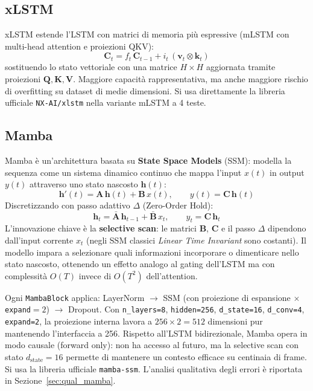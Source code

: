 \documentclass[12pt, a4paper]{article}
\begin{document}
\subsection{xLSTM}
xLSTM \cite{beck2024xlstm} estende l'LSTM con matrici di memoria pi\`u
espressive (mLSTM con multi-head attention e proiezioni QKV):
\begin{equation}
  \mathbf{C}_t = f_t\,\mathbf{C}_{t-1} + i_t\,(\mathbf{v}_t \otimes \mathbf{k}_t)
\end{equation}
sostituendo lo stato vettoriale con una matrice $H\times H$ aggiornata tramite
proiezioni $\mathbf{Q}, \mathbf{K}, \mathbf{V}$. Maggiore capacit\`a
rappresentativa, ma anche maggiore rischio di overfitting su dataset di medie
dimensioni. Si usa direttamente la libreria ufficiale \texttt{NX-AI/xlstm}
nella variante mLSTM a 4 teste.

\subsection{Mamba}
\label{sec:mamba}
Mamba \cite{gu2024mamba} \`e un'architettura basata su \textbf{State Space Models}
(SSM): modella la sequenza come un sistema dinamico continuo che mappa l'input
$x(t)$ in output $y(t)$ attraverso uno stato nascosto $\mathbf{h}(t)$:
\begin{equation}
  \mathbf{h}'(t) = \mathbf{A}\,\mathbf{h}(t) + \mathbf{B}\,x(t), \qquad
  y(t) = \mathbf{C}\,\mathbf{h}(t)
\end{equation}
Discretizzando con passo adattivo $\Delta$ (Zero-Order Hold):
\begin{equation}
  \mathbf{h}_t = \bar{\mathbf{A}}\,\mathbf{h}_{t-1} + \bar{\mathbf{B}}\,x_t,
  \qquad y_t = \mathbf{C}\,\mathbf{h}_t
\end{equation}
L'innovazione chiave \`e la \textbf{selective scan}: le matrici
$\mathbf{B}$, $\mathbf{C}$ e il passo $\Delta$ dipendono dall'input corrente
$x_t$ (negli SSM classici \textit{Linear Time Invariant} sono costanti).
Il modello impara a selezionare quali informazioni incorporare o dimenticare
nello stato nascosto, ottenendo un effetto analogo al gating dell'LSTM ma
con complessit\`a $O(T)$ invece di $O(T^2)$ dell'attention.

Ogni \texttt{MambaBlock} applica: LayerNorm $\to$ SSM (con proiezione di
espansione $\times$\texttt{expand}$=2$) $\to$ Dropout.
Con \texttt{n\_layers=8}, \texttt{hidden=256}, \texttt{d\_state=16},
\texttt{d\_conv=4}, \texttt{expand=2}, la proiezione interna lavora a
$256\times 2=512$ dimensioni pur mantenendo l'interfaccia a 256.
Rispetto all'LSTM bidirezionale, Mamba opera in modo causale (forward only):
non ha accesso al futuro, ma la selective scan con stato
$d_{\text{state}}=16$ permette di mantenere un contesto efficace su centinaia
di frame. Si usa la libreria ufficiale \texttt{mamba-ssm}.
L'analisi qualitativa degli errori \`e riportata in
Sezione~\ref{sec:qual_mamba}.
\end{document}
